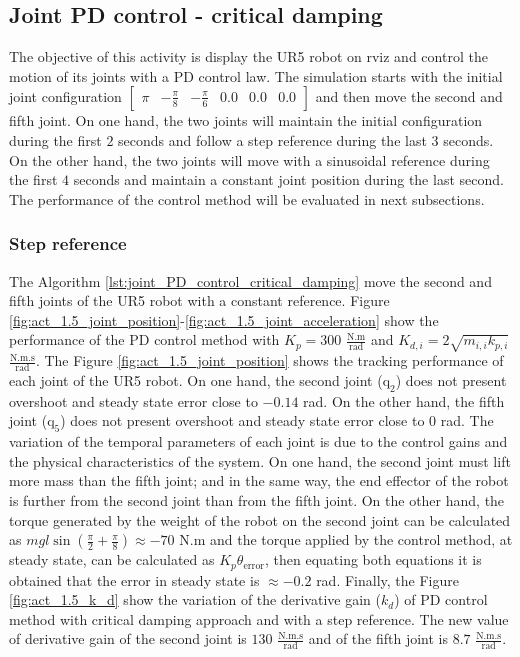 \subsection{Joint PD control - critical damping}
The objective of this activity is display the UR5 robot on rviz and control the motion of its joints with a PD control law. The simulation starts with the initial joint configuration $\begin{bmatrix} \pi & -\frac{\pi}{8} & -\frac{\pi}{6} & 0.0 & 0.0 & 0.0 \end{bmatrix}$ and then move the second and fifth joint. On one hand, the two joints will maintain the initial configuration during the first $2$ seconds and follow a step reference during the last $3$ seconds. On the other hand, the two joints  will move with a sinusoidal reference during the first $4$ seconds and  maintain a constant joint position during the last second. The performance of the control method will be evaluated in next subsections.

\subsubsection{Step reference}
The Algorithm \ref{lst:joint_PD_control_critical_damping} move the second and fifth joints of the UR5 robot with a constant reference. Figure \ref{fig:act_1.5_joint_position}-\ref{fig:act_1.5_joint_acceleration} show the performance of the PD control method with $K_p=300$ $\mathrm{\frac{N.m}{rad}}$ and $K_{d,i}=2 \sqrt{m_{i,i} k_{p,i}}$ $\mathrm{\frac{N.m.s}{rad}}$. The Figure \ref{fig:act_1.5_joint_position} shows the tracking performance of each joint of the UR5 robot. On one hand, the second joint ($\mathrm{q}_2$) does not present overshoot and steady state error close to $-0.14$ rad. On the other hand, the fifth joint ($\mathrm{q}_5$) does not present overshoot and steady state error close to $0$ rad. The variation of the temporal parameters of each joint is due to the control gains and the physical characteristics of the system. On one hand, the second joint must lift more mass than the fifth joint; and in the same way, the end effector of the robot is further from the second joint than from the fifth joint. On the other hand, the torque generated by the weight of the robot on the second joint can be calculated as $m g l \sin({\frac{\pi}{2} + \frac{\pi}{8}}) \approx -70$ N.m and the torque applied by the control method, at steady state, can be calculated as $K_p \theta_{\mathrm{error}}$, then equating both equations it is obtained that the error in steady state is $\approx -0.2$ rad. Finally, the Figure \ref{fig:act_1.5_k_d} show the variation of the derivative gain ($k_d$) of PD control method with critical damping approach and with a step reference. The new value of derivative gain of the second joint is $130$ $\mathrm{\frac{N.m.s}{rad}}$ and of the fifth joint is $8.7$ $\mathrm{\frac{N.m.s}{rad}}$. 

